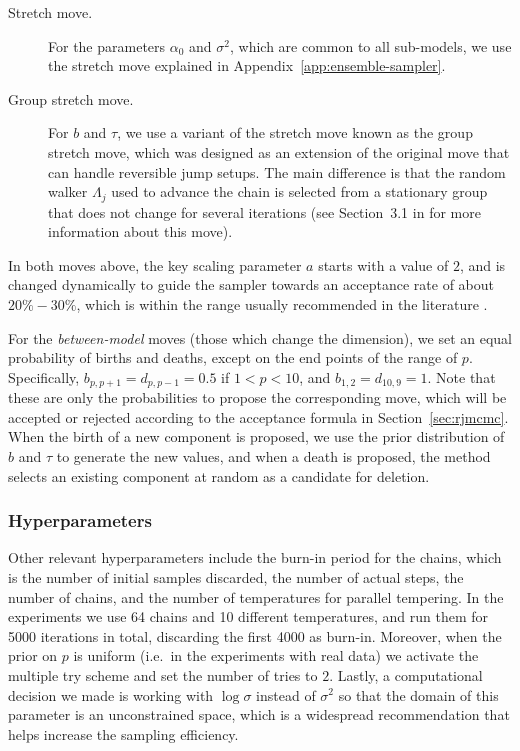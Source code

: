 \begin{description}
  \item[Stretch move.] For the parameters \(\alpha_0\) and \(\sigma^2\), which are common to all sub-models, we use the stretch move explained in Appendix~\ref{app:ensemble-sampler}. 
  \item[Group stretch move.] For \(b\) and \(\tau\), we use a variant of the stretch move known as the group stretch move, which was designed as an extension of the original move that can handle reversible jump setups. The main difference is that the random walker \(\Lambda_j\) used to advance the chain is selected from a stationary group that does not change for several iterations (see Section~3.1 in \citealp{karnesis2023eryn} for more information about this move).
\end{description}
In both moves above, the key scaling parameter \(a\) starts with a value of \(2\), and is changed dynamically to guide the sampler towards an acceptance rate of about \(20\%-30\%\), which is within the range usually recommended in the literature \citep[e.g.][]{rosenthal2011optimal}.

For the \textit{between-model} moves (those which change the dimension), we set an equal probability of births and deaths, except on the end points of the range of \(p\). Specifically, \(b_{p,p+1}=d_{p, p-1}=0.5\) if \(1<p<10\), and \(b_{1,2}=d_{10,9}=1\). Note that these are only the probabilities to propose the corresponding move, which will be accepted or rejected according to the acceptance formula in Section~\ref{sec:rjmcmc}. When the birth of a new component is proposed, we use the prior distribution of \(b\) and \(\tau\) to generate the new values, and when a death is proposed, the method selects an existing component at random as a candidate for deletion.

\subsubsection*{Hyperparameters}

Other relevant hyperparameters include the burn-in period for the chains, which is the number of initial samples discarded, the number of actual steps, the number of chains, and the number of temperatures for parallel tempering. In the experiments we use 64 chains and 10 different temperatures, and run them for 5000 iterations in total, discarding the first 4000 as burn-in. Moreover, when the prior on \(p\) is uniform (i.e.~in the experiments with real data) we activate the multiple try scheme and set the number of tries to \(2\). Lastly, a computational decision we made is working with \(\log \sigma\) instead of \(\sigma^2\) so that the domain of this parameter is an unconstrained space, which is a widespread recommendation that helps increase the sampling efficiency.


